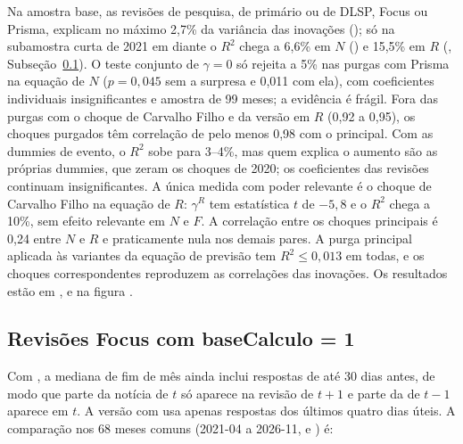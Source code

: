 \documentclass[12pt,a4paper]{article}
\begin{document}
Na amostra base, as revisões de pesquisa, de primário ou de DLSP, Focus ou Prisma,
explicam no máximo 2,7\% da variância das inovações (); só na
subamostra curta de 2021 em diante o \(R^2\) chega a 6,6\% em \(N\)
() e 15,5\% em \(R\) (, Subseção~\ref{sec:bc1}). O teste conjunto de \(\gamma=0\) só rejeita a 5\%
nas purgas com Prisma na equação de \(N\) (\(p=0{,}045\) sem a surpresa e 0,011 com
ela), com coeficientes individuais insignificantes e amostra de 99 meses; a
evidência é frágil. Fora das purgas com o choque de Carvalho Filho e da versão
 em \(R\) (0,92 a 0,95), os choques purgados têm correlação de
pelo menos 0,98 com o principal. Com as dummies de evento, o \(R^2\) sobe para 3--4\%,
mas quem explica o aumento são as próprias dummies, que zeram os choques de 2020;
os coeficientes das revisões continuam insignificantes. A única medida com poder
relevante é o choque de Carvalho Filho na equação de \(R\): \(\gamma^R\) tem
estatística \(t\) de \(-5{,}8\) e o \(R^2\) chega a 10\%, sem efeito relevante em
\(N\) e \(F\). A correlação entre os choques principais é 0,24 entre \(N\) e \(R\) e
praticamente nula nos demais pares. A purga principal aplicada às variantes da
equação de previsão tem \(R^2\le 0{,}013\) em todas, e os choques correspondentes
reproduzem as correlações das inovações. Os resultados estão em
,
 e na figura .

\subsection{Revisões Focus com baseCalculo = 1}\label{sec:bc1}

Com , a mediana de fim de mês ainda inclui respostas de até 30
dias antes, de modo que parte da notícia de \(t\) só aparece na revisão de \(t+1\) e
parte da de \(t-1\) aparece em \(t\). A versão com  usa apenas
respostas dos últimos quatro dias úteis. A comparação nos 68 meses comuns
(2021-04 a 2026-11,  e
) é:
\end{document}
